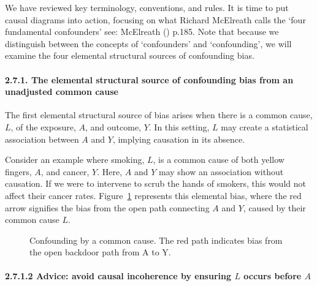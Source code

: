 \documentclass[
  singlecolumn]{article}
\let\oldparagraph\paragraph
\renewcommand{\paragraph}[1]{\oldparagraph{#1}\mbox{}}
\begin{document}
We have reviewed key terminology, conventions, and rules. It is time to
put causal diagrams into action, focusing on what Richard McElreath
calls the `four fundamental confounders' see: McElreath
() p.185. Note that because we
distinguish between the concepts of `confounders' and `confounding', we
will examine the four elemental structural sources of confounding bias.

\paragraph{2.7.1. The elemental structural source of confounding bias
from an unadjusted common
cause}\label{the-elemental-structural-source-of-confounding-bias-from-an-unadjusted-common-cause}

The first elemental structural source of bias arises when there is a
common cause, \(L\), of the exposure, \(A\), and outcome, \(Y\). In this
setting, \(L\) may create a statistical association between \(A\) and
\(Y\), implying causation in its absence.

Consider an example where smoking, \(L\), is a common cause of both
yellow fingers, \(A\), and cancer, \(Y\). Here, \(A\) and \(Y\) may show
an association without causation. If we were to intervene to scrub the
hands of smokers, this would not affect their cancer rates.
Figure~\ref{fig-dag-common-cause} represents this elemental bias, where
the red arrow signifies the bias from the open path connecting \(A\) and
\(Y\), caused by their common cause \(L\).

\begin{figure}


\caption{\label{fig-dag-common-cause}Confounding by a common cause. The
red path indicates bias from the open backdoor path from A to Y.}

\end{figure}%

\paragraph{\texorpdfstring{2.7.1.2 Advice: avoid causal incoherence by
ensuring \(L\) occurs before
\(A\)}{2.7.1.2 Advice: avoid causal incoherence by ensuring L occurs before A}}\label{advice-avoid-causal-incoherence-by-ensuring-l-occurs-before-a}
\end{document}

